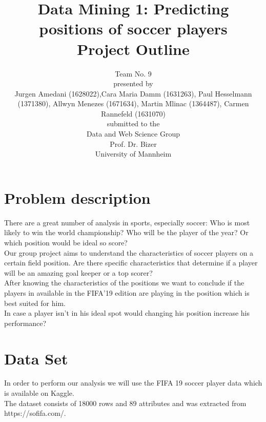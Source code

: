 \documentclass[runningheads]{llncs}
\begin{document}
%
\title{Data Mining 1: Predicting positions of soccer players\\
Project Outline}


\vspace{2cm}
\author{Team No. 9\\
\vspace{1cm}
presented by\\
Jurgen Amedani (1628022),Cara Maria Damm (1631263),
Paul Hesselmann (1371380),
Allwyn Menezes (1671634),
Martin Mlinac (1364487),
Carmen Rannefeld (1631070)\\
\vspace{1cm}
submitted to the \\
Data and Web Science Group\\
Prof. Dr. Bizer\\
University of Mannheim}

\maketitle              %
\newpage
\section{Problem description}
There are a great number of analysis in sports, especially soccer: Who is most likely to win the world championship? Who will be the player of the year? Or which position would be ideal so score? \\

Our group project aims to understand the characteristics of soccer players on a certain field position. Are there specific characteristics that determine if a player will be an amazing goal keeper or a top scorer?\\
After knowing the characteristics of the positions we want to conclude if the players in available in the FIFA'19 edition are playing in the position which is best suited for him.\\
In case a player isn't in his ideal spot would changing his position increase his performance?


\section{Data Set}
In order to perform our analysis we will use the FIFA 19 soccer player data which is available on Kaggle.\\
The dataset consists of 18000 rows and 89 attributes and was extracted from https://sofifa.com/.
\end{document}
